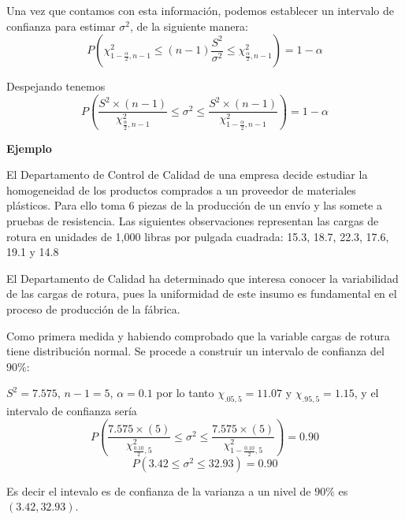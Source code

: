 \documentclass[
  10pt,
  ignorenonframetext,
]{beamer}
\begin{document}
\begin{frame}{}
\protect\hypertarget{section-19}{}
Una vez que contamos con esta información, podemos establecer un
intervalo de confianza para estimar \(\sigma^2\), de la siguiente
manera:
\[ P\left( \chi_{1-\frac{\alpha}{2},n-1}^2 \le (n-1)\frac{S^2}{\sigma^2} \le \chi_{\frac{\alpha}{2},n-1}^2 \right)  = 1-\alpha \]

Despejando tenemos
\[ P\left( \frac{S^2 \times (n-1)}{\chi_{\frac{\alpha}{2},n-1}^2} \le \sigma^2 \le\frac{S^2 \times (n-1)}{\chi_{1-\frac{\alpha}{2},n-1}^2} \right)  = 1-\alpha \]
\end{frame}

\begin{frame}{}
\protect\hypertarget{section-20}{}
\textbf{Ejemplo}

El Departamento de Control de Calidad de una empresa decide estudiar la
homogeneidad de los productos comprados a un proveedor de materiales
plásticos. Para ello toma 6 piezas de la producción de un envío y las
somete a pruebas de resistencia. Las siguientes observaciones
representan las cargas de rotura en unidades de 1,000 libras por pulgada
cuadrada: 15.3, 18.7, 22.3, 17.6, 19.1 y 14.8

El Departamento de Calidad ha determinado que interesa conocer la
variabilidad de las cargas de rotura, pues la uniformidad de este insumo
es fundamental en el proceso de producción de la fábrica.

Como primera medida y habiendo comprobado que la variable cargas de
rotura tiene distribución normal. Se procede a construir un intervalo de
confianza del \(90\%\):
\end{frame}

\begin{frame}{}
\protect\hypertarget{section-21}{}
\(S^2=7.575\), \(n-1=5\), \(\alpha=0.1\) por lo tanto
\(\chi_{.05,5}=11.07\) y \(\chi_{.95,5}=1.15\), y el intervalo de
confianza sería
\[ P\left( \frac{7.575 \times (5)}{\chi_{\frac{0.10}{2},5}^2} \le \sigma^2 \le\frac{7.575 \times (5)}{\chi_{1-\frac{0.10}{2},5}^2} \right)  = 0.90 \]
\[ P\left( 3.42 \le \sigma^2 \le 32.93 \right)  = 0.90 \]

Es decir el intevalo es de confianza de la varianza a un nivel de
\(90\%\) es \((3.42,32.93)\).
\end{frame}
\end{document}
